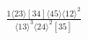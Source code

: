 \documentclass[varwidth, border=5pt]{standalone}
\begin{document}
\begin{my}
$\begin{gathered}
\scriptscriptstyle\frac{1⟨23⟩[34]⟨45⟩⟨12⟩^2}{⟨13⟩^3⟨24⟩^2[35]}
\end{gathered}$
\end{my}
\end{document}
